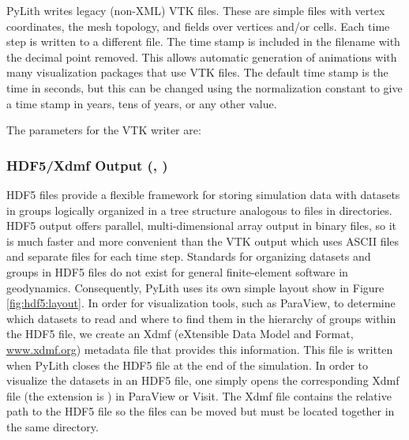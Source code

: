 PyLith writes legacy (non-XML) VTK files. These are simple files with
vertex coordinates, the mesh topology, and fields over vertices and/or
cells. Each time step is written to a different file. The time stamp
is included in the filename with the decimal point removed. This allows
automatic generation of animations with many visualization packages
that use VTK files. The default time stamp is the time in seconds,
but this can be changed using the normalization constant to give a
time stamp in years, tens of years, or any other value.


The parameters for the VTK writer are:
\begin{inventory}
\end{inventory}


\subsubsection{HDF5/Xdmf Output (, )}
\label{sub:HDF5/Xdmf-Output}

HDF5 files provide a flexible framework for storing simulation data
with datasets in groups logically organized in a tree structure analogous
to files in directories. HDF5 output offers parallel, multi-dimensional
array output in binary files, so it is much faster and more convenient
than the VTK output which uses ASCII files and separate files for
each time step. Standards for organizing datasets and groups in HDF5
files do not exist for general finite-element software in geodynamics.
Consequently, PyLith uses its own simple layout show in Figure \vref{fig:hdf5:layout}.
In order for visualization tools, such as ParaView, to determine which
datasets to read and where to find them in the hierarchy of groups
within the HDF5 file, we create an Xdmf (eXtensible Data Model and
Format, \url{www.xdmf.org}) metadata file that provides this information.
This file is written when PyLith closes the HDF5 file at the end of
the simulation. In order to visualize the datasets in an HDF5 file,
one simply opens the corresponding Xdmf file (the extension is )
in ParaView or Visit. The Xdmf file contains the relative path to
the HDF5 file so the files can be moved but must be located together
in the same directory. 

